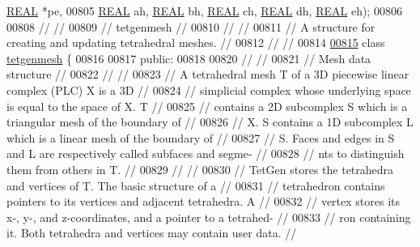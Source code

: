 \begin{DoxyCode}
      \hyperlink{tetgen_8h_a4b654506f18b8bfd61ad2a29a7e38c25}{REAL} *pe,
00805               \hyperlink{tetgen_8h_a4b654506f18b8bfd61ad2a29a7e38c25}{REAL} ah, \hyperlink{tetgen_8h_a4b654506f18b8bfd61ad2a29a7e38c25}{REAL} bh, \hyperlink{tetgen_8h_a4b654506f18b8bfd61ad2a29a7e38c25}{REAL} ch, \hyperlink{tetgen_8h_a4b654506f18b8bfd61ad2a29a7e38c25}{REAL} dh, \hyperlink{tetgen_8h_a4b654506f18b8bfd61ad2a29a7e38c25}{REAL} eh);
00806 
00808 \textcolor{comment}{//                                                                           //}
00809 \textcolor{comment}{// tetgenmesh                                                                //}
00810 \textcolor{comment}{//                                                                           //}
00811 \textcolor{comment}{// A structure for creating and updating tetrahedral meshes.                 //}
00812 \textcolor{comment}{//                                                                           //}
00814 \textcolor{comment}{}
\hypertarget{tetgen_8h_source.tex_l00815}{}\hyperlink{classtetgenmesh}{00815} \textcolor{keyword}{class }\hyperlink{classtetgenmesh}{tetgenmesh} \{
00816 
00817 \textcolor{keyword}{public}:
00818 
00820 \textcolor{comment}{//                                                                           //}
00821 \textcolor{comment}{// Mesh data structure                                                       //}
00822 \textcolor{comment}{//                                                                           //}
00823 \textcolor{comment}{// A tetrahedral mesh T of a 3D piecewise linear complex (PLC) X is a 3D     //}
00824 \textcolor{comment}{// simplicial complex whose underlying space is equal to the space of X.  T  //}
00825 \textcolor{comment}{// contains a 2D subcomplex S which is a triangular mesh of the boundary of  //}
00826 \textcolor{comment}{// X. S contains a 1D subcomplex L which is a linear mesh of the boundary of //}
00827 \textcolor{comment}{// S. Faces and edges in S and L are respectively called subfaces and segme- //}
00828 \textcolor{comment}{// nts to distinguish them from others in T.                                 //}
00829 \textcolor{comment}{//                                                                           //}
00830 \textcolor{comment}{// TetGen stores the tetrahedra and vertices of T. The basic structure of a  //}
00831 \textcolor{comment}{// tetrahedron contains pointers to its vertices and adjacent tetrahedra. A  //}
00832 \textcolor{comment}{// vertex stores its x-, y-, and z-coordinates, and a pointer to a tetrahed- //}
00833 \textcolor{comment}{// ron containing it. Both tetrahedra and vertices may contain user data.    // }

\end{DoxyCode}
